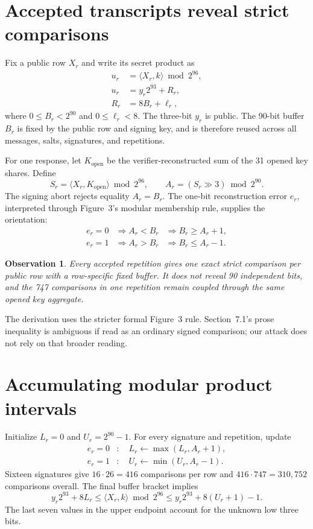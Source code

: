 \documentclass[10pt,a4paper]{article}
\newtheorem{observation}{Observation}
\begin{document}
\section{Accepted transcripts reveal strict comparisons}

Fix a public row $X_r$ and write its secret product as
\begin{align*}
u_r&=\langle X_r,k\rangle\bmod 2^{96},\\
u_r&=y_r2^{93}+R_r,\\
R_r&=8B_r+\ell_r,
\end{align*}
where $0\leq B_r<2^{90}$ and $0\leq\ell_r<8$.  The three-bit $y_r$ is public.
The 90-bit buffer $B_r$ is fixed by the public row and signing key, and is
therefore reused across all messages, salts, signatures, and repetitions.

For one response, let $K_{\mathrm{open}}$ be the verifier-reconstructed sum of
the 31 opened key shares.  Define
\[
S_r=\langle X_r,K_{\mathrm{open}}\rangle\bmod 2^{96},\qquad
A_r=(S_r\mathbin{\gg}3)\bmod 2^{90}.
\]
The signing abort rejects equality $A_r=B_r$.  The one-bit reconstruction error
$e_r$, interpreted through Figure~3's modular membership rule, supplies the
orientation:
\[
\begin{array}{lll}
e_r=0 &\Longrightarrow A_r<B_r &\Longrightarrow B_r\geq A_r+1,\\
e_r=1 &\Longrightarrow A_r>B_r &\Longrightarrow B_r\leq A_r-1.
\end{array}
\]

\begin{observation}
Every accepted repetition gives one exact strict comparison per public row
with a row-specific fixed buffer.  It does not reveal 90 independent bits, and
the 747 comparisons in one repetition remain coupled through the same opened
key aggregate.
\end{observation}

The derivation uses the stricter formal Figure~3 rule.  Section~7.1's prose
inequality is ambiguous if read as an ordinary signed comparison; our attack
does not rely on that broader reading.

\section{Accumulating modular product intervals}

Initialize $L_r=0$ and $U_r=2^{90}-1$.  For every signature and repetition,
update
\[
\begin{split}
e_r=0 &: \quad L_r\leftarrow\max(L_r,A_r+1),\\
e_r=1 &: \quad U_r\leftarrow\min(U_r,A_r-1).
\end{split}
\]
Sixteen signatures give $16\cdot26=416$ comparisons per row and
$416\cdot747=310{,}752$ comparisons overall.  The final buffer bracket implies
\[
y_r2^{93}+8L_r
\leq \langle X_r,k\rangle\bmod 2^{96}
\leq y_r2^{93}+8(U_r+1)-1.                 \tag{1}
\]
The last seven values in the upper endpoint account for the unknown low three
bits.
\end{document}
